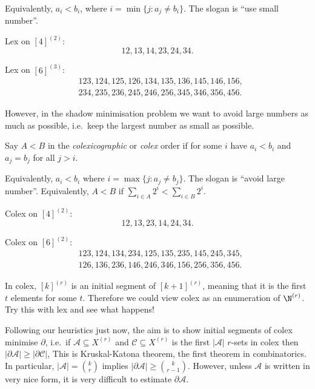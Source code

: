 \documentclass[a4paper]{article}
\newcommand{\shadow}{\partial}
\begin{document}
Equivalently, \(a_i < b_i\), where \(i = \min\{j: a_j \neq b_i\}\). The slogan is ``use small number''.

\begin{eg}
  Lex on \([4]^{(2)}\):
  \[
    12, 13, 14, 23, 24, 34.
  \]

  Lex on \([6]^{(3)}\):
  \begin{align*}
    &123, 124, 125, 126, 134, 135, 136, 145, 146, 156, \\
    &234, 235, 236, 245, 246, 256, 345, 346, 356, 456.
  \end{align*}
\end{eg}

However, in the shadow minimisation problem we want to avoid large numbers as much as possible, i.e.\ keep the largest number as small as possible.

\begin{definition}
  Say \(A < B\) in the \emph{colexicographic} or \emph{colex} order if for some \(i\) have \(a_i < b_i\) and \(a_j = b_j\) for all \(j > i\).
\end{definition}

Equivalently, \(a_i < b_i\) where \(i = \max\{j: a_j \neq b_j\}\). The slogan is ``avoid large number''. Equivalently, \(A < B\) if \(\sum_{i \in A} 2^i < \sum_{i \in B} 2^i\).

\begin{eg}
  Colex on \([4]^{(2)}\):
  \[
    12, 13, 23, 14, 24, 34.
  \]

  Colex on \([6]^{(2)}\):
  \begin{align*}
    &123, 124, 134, 234, 125, 135, 235, 145, 245, 345,\\
    &126, 136, 236, 146, 246, 346, 156, 256, 356, 456.
  \end{align*}
\end{eg}

\begin{note}
  In colex, \([k]^{(r)}\) is an initial segment of \([k + 1]^{(r)}\), meaning that it is the first \(t\) elements for some \(t\). Therefore we could view colex as an enumeration of \(\N^{(r)}\). Try this with lex and see what happens!
\end{note}

Following our heuristics just now, the aim is to show initial segments of colex minimise \(\shadow\), i.e.\ if \(\mathcal A \subseteq X^{(r)}\) and \(\mathcal C \subseteq X^{(r)}\) is the first \(|\mathcal A|\) \(r\)-sets in colex then \(|\shadow \mathcal A| \geq |\shadow \mathcal C|\), This is Kruskal-Katona theorem, the first theorem in combinatorics.
In particular, \(|\mathcal A| = \binom{k}{r}\) implies \(|\shadow \mathcal A| \geq \binom{k}{r - 1}\). However, unless \(\mathcal A\) is written in very nice form, it is very difficult to estimate \(\shadow \mathcal A\).
\end{document}
